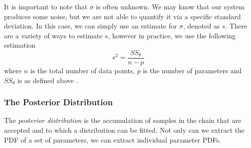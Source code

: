\documentclass{article}
\begin{document}
\par It is important to note that $\sigma$ is often unknown. We may know that our system produces some noise, but we are not able to quantify it via a specific standard deviation. In this case, we can simply use an estimate for $\sigma$, denoted as $s$. There are a variety of ways to estimate $s$, however in practice, we use the following estimation
\begin{equation} \label{eq:7mcmc}
s^2 = \frac{SS_{\theta}}{n-p}
\end{equation}
where $n$ is the total number of data points, $p$ is the number of parameters and $SS_{\theta}$ is as defined above \cite{smithCh8}.
\subsubsection{The Posterior Distribution} The \emph{posterior distribution} is the accumulation of samples in the chain that are accepted and to which a distribution can be fitted. Not only can we extract the PDF of a set of parameters, we can extract individual parameter PDFs.
\end{document}

